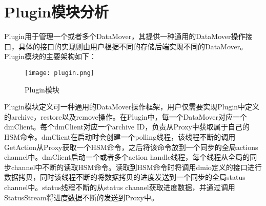\section{Plugin模块分析}

Plugin用于管理一个或者多个DataMover，其提供一种通用的DataMover操作接口，具体的接口的实现则由用户根据不同的存储后端实现不同的DataMover。Plugin模块的主要架构如下： 

\begin{figure}[!htb]
    \centering
    \texttt{[image: plugin.png]}
    \caption{Plugin模块}\label{fig:region-image}
\end{figure}

Plugin模块定义可一种通用的DataMover操作框架，用户仅需要实现Plugin中定义的archive，restore以及remove操作。在Plugin中，每一个DataMover对应一个dmClient。每个dmClient对应一个archive ID，负责从Proxy中获取属于自己的HSM命令。dmClient在启动时会创建一个polling线程，该线程不断的调用GetAction从Proxy获取一个HSM命令，之后将该命令放到一个同步的全局actions channel中。dmClient启动一个或者多个action handle线程，每个线程从全局的同步channel中不断的读取HSM命令。读取到HSM命令时将调用dmio定义的接口进行数据拷贝，同时该线程不断的将数据拷贝的进度发送到一个同步的全局status channel中。status线程不断的从status channel获取进度数据，并通过调用StatusStream将进度数据不断的发送到Proxy中。 


